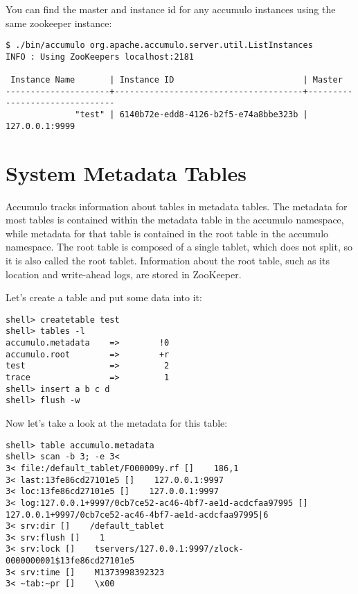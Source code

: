 You can find the master and instance id for any accumulo instances using the same zookeeper instance:

\begingroup\fontsize{8pt}{8pt}\selectfont\begin{verbatim}
$ ./bin/accumulo org.apache.accumulo.server.util.ListInstances
INFO : Using ZooKeepers localhost:2181

 Instance Name       | Instance ID                          | Master                        
---------------------+--------------------------------------+-------------------------------
              "test" | 6140b72e-edd8-4126-b2f5-e74a8bbe323b |                127.0.0.1:9999
\end{verbatim}\endgroup

\section{System Metadata Tables}
\label{sec:metadata}

Accumulo tracks information about tables in metadata tables. The metadata for
most tables is contained within the metadata table in the accumulo namespace,
while metadata for that table is contained in the root table in the accumulo
namespace. The root table is composed of a single tablet, which does not
split, so it is also called the root tablet. Information about the root
table, such as its location and write-ahead logs, are stored in ZooKeeper.

Let's create a table and put some data into it:

\begingroup\fontsize{8pt}{8pt}\selectfont\begin{verbatim}
shell> createtable test
shell> tables -l
accumulo.metadata    =>        !0
accumulo.root        =>        +r
test                 =>         2
trace                =>         1
shell> insert a b c d
shell> flush -w
\end{verbatim}\endgroup

Now let's take a look at the metadata for this table:

\begingroup\fontsize{8pt}{8pt}\selectfont\begin{verbatim}
shell> table accumulo.metadata
shell> scan -b 3; -e 3<
3< file:/default_tablet/F000009y.rf []    186,1
3< last:13fe86cd27101e5 []    127.0.0.1:9997
3< loc:13fe86cd27101e5 []    127.0.0.1:9997
3< log:127.0.0.1+9997/0cb7ce52-ac46-4bf7-ae1d-acdcfaa97995 []    127.0.0.1+9997/0cb7ce52-ac46-4bf7-ae1d-acdcfaa97995|6
3< srv:dir []    /default_tablet
3< srv:flush []    1
3< srv:lock []    tservers/127.0.0.1:9997/zlock-0000000001$13fe86cd27101e5
3< srv:time []    M1373998392323
3< ~tab:~pr []    \x00
\end{verbatim}\endgroup

